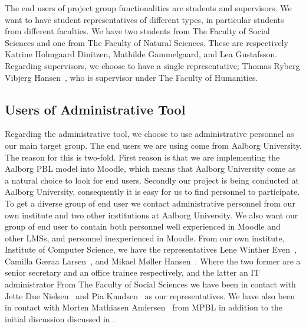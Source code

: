 The end users of project group functionalities are students and supervisors.
We want to have student representatives of different types, in particular students from different faculties.
We have two students from The Faculty of Social Sciences and one from The Faculty of Natural Sciences.
These are respectively Katrine Holmgaard Dinitzen, Mathilde Gammelgaard, and Lea Gustafsson.
Regarding supervisors, we choose to have a single representative; Thomas Ryberg Vibjerg Hansen~\cite{thomas}, who is supervisor under The Faculty of Humanities.

\subsection{Users of Administrative Tool}
\label{sub:enduserstool}
Regarding the administrative tool, we choose to use administrative personnel as our main target group.
The end users we are using come from Aalborg University.
The reason for this is two-fold.
First reason is that we are implementing the Aalborg PBL model into Moodle, which means that Aalborg University come as a natural choice to look for end users.
Secondly our project is being conducted at Aalborg University, consequently it is easy for us to find personnel to participate.
To get a diverse group of end user we contact administrative personnel from our own institute and two other institutions at Aalborg University.
We also want our group of end user to contain both personnel well experienced in Moodle and other LMSs, and personnel inexperienced in Moodle.
From our own institute, Institute of Computer Science, we have the representatives Lene Winther Even~\cite{lene}, Camilla G\ae{}raa Larsen~\cite{camilla}, and Mikael M\o{}ller Hansen~\cite{mikael}.
Where the two former are a senior secretary and an office trainee respectively, and the latter an IT administrator
From The Faculty of Social Sciences we have been in contact with  Jette Due Nielsen~\cite{jette} and Pia Knudsen~\cite{piak} as our representatives.
We have also been in contact with Morten Mathiasen Andersen~\cite{morten} from MPBL in addition to the initial discussion discussed in .
